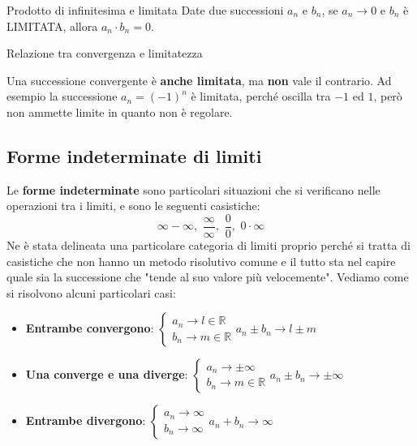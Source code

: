 \documentclass[12pt]{report}
\newcommand{\R}{\mathbb{R}}
\begin{document}
	\begin{teorema}{Prodotto di infinitesima e limitata}{}
		Date due successioni $a_n$ e $b_n$, se $a_n \to 0$ e $b_n$ è LIMITATA, allora $a_n \cdot b_n = 0$.
	\end{teorema}
	
	\begin{teorema}{Relazione tra convergenza e limitatezza}{}
		
		Una successione convergente è \textbf{anche limitata}, ma \textbf{non} vale il contrario.
		\smallbreak
		Ad esempio la successione $a_n = (-1)^n$ è limitata, perché oscilla tra $-1$ ed $1$, però non ammette limite in quanto non è regolare.
		
	\end{teorema}
	
	\subsection{Forme indeterminate di limiti}
	
	Le \textbf{forme indeterminate} sono particolari situazioni che si verificano nelle operazioni tra i limiti, e sono le seguenti casistiche:
	\[
		\infty - \infty,\,\, \frac{\infty}{\infty},\,\, \frac{0}{0},\,\, 0 \cdot \infty
	\]
	Ne è stata delineata una particolare categoria di limiti proprio perché si tratta di casistiche che non hanno un metodo risolutivo comune e il tutto sta nel capire quale sia la successione che "tende al suo valore più velocemente".
	Vediamo come si risolvono alcuni particolari casi:
	
	\begin{itemize}
		
		\item \textbf{Entrambe convergono}: $\begin{cases}
			a_n \to l \in \R\\
			b_n \to m \in \R
		\end{cases}
		a_n \pm b_n \to l \pm m$
		
		\item \textbf{Una converge e una diverge}: $\begin{cases}
			a_n \to \pm \infty\\
			b_n \to m \in \R
		\end{cases}
		a_n \pm b_n \to \pm \infty$
		
		\item \textbf{Entrambe divergono}: $\begin{cases}
			a_n \to \infty\\
			b_n \to \infty
		\end{cases}
		a_n + b_n \to \infty$
		
	\end{itemize}
	
\end{document}
